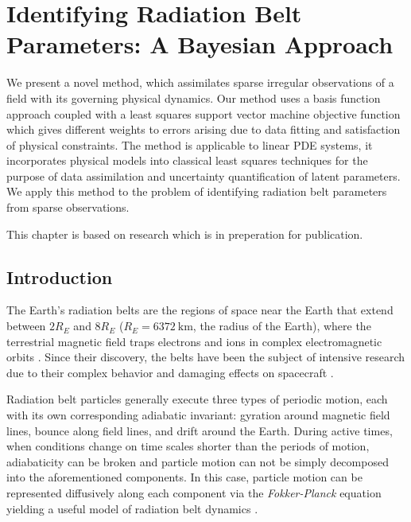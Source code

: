 \chapter{Identifying Radiation Belt Parameters: A Bayesian Approach}
\label{chapter:bayes_diff_chapter}

{\small
  We present a novel method, which assimilates sparse irregular observations of a field with its 
  governing physical dynamics. Our method uses a basis function approach coupled with a least 
  squares support vector machine objective function which gives different weights to errors arising 
  due to data fitting and satisfaction of physical constraints. The method is applicable to linear 
  PDE systems, it incorporates physical models into classical least squares techniques for the 
  purpose of data assimilation and uncertainty quantification of latent parameters. We apply this 
  method to the problem of identifying radiation belt parameters from sparse observations.
}

\vfill
{}
\vfill

\noindent
    \parbox{\textwidth}{%
        {\small This chapter is based on research which is in preperation for publication.}
    }%


\clearpage


\section{Introduction}\label{sec:diffIntro}

The Earth's radiation belts are the regions of space near the Earth that extend between $2R_E$ 
and $8R_E$ ($R_E = \SI{6372}{\kilo\metre}$, the radius of the Earth), where the terrestrial 
magnetic field traps electrons and ions in complex electromagnetic orbits  \citep{vanAllen}. Since 
their discovery, the belts have been the subject of intensive research due to their complex 
behavior and damaging effects on spacecraft \citep{GUBBY20021723, WellingSatellite, baker2002}.

Radiation belt particles generally execute three types of periodic motion, each with its own 
corresponding adiabatic invariant: gyration around magnetic field lines, bounce along field lines, 
and drift around the Earth. During active times, when conditions change on time scales shorter than 
the periods of motion, adiabaticity can be broken and particle motion can not be simply decomposed 
into the aforementioned components. In this case, particle motion can be represented diffusively 
along each component via the \emph{Fokker-Planck} equation yielding a useful model of radiation 
belt dynamics \citep{schulz2012particle}.

